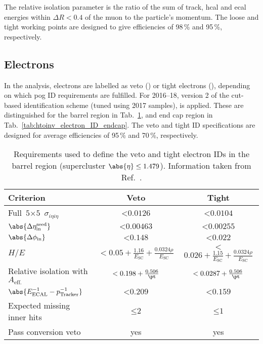 The relative isolation parameter is the ratio of the sum of track, \acrshort{hcal} and \acrshort{ecal} energies within $\Delta R < \text{0.4}$ of the muon to the particle's momentum. The loose and tight working points are designed to give efficiencies of 98\,\% and 95\,\%, respectively.




\subsection{Electrons}
\label{subsec:objects_electrons}

In the analysis, electrons are labelled as veto (\vetoEle) or tight electrons (\tightEle), depending on which \acrshort{pog} ID requirements are fulfilled. For 2016--18, version 2 of the cut-based identification scheme (tuned using 2017 samples), is applied. These are distinguished for the barrel region in Tab.~\ref{tab:htoinv_electron_ID_barrel}, and end cap region in Tab.~\ref{tab:htoinv_electron_ID_endcap}. The veto and tight ID specifications are designed for average efficiencies of 95\,\% and 70\,\%, respectively.

\begin{table}[htbp]
    \centering
    \begin{tabular}{lcc}
    \hline
    Criterion & Veto & Tight \\\hline
    Full $\text{5} \times \text{5}$ $\sigma_{i\eta i\eta}$ & $< \text{0.0126}$ & $< \text{0.0104}$    \\
    $\abs{\Delta\eta_{\mathrm{in}}^{\mathrm{seed}}}$ & $< \text{0.00463}$ & $< \text{0.00255}$ \\
    $\abs{\Delta\phi_{\mathrm{in}}}$ & $< \text{0.148}$ & $< \text{0.022}$ \\
    $H/E$ & $<\text{0.05} + \frac{\text{1.16}}{E_{\mathrm{SC}}} + \frac{\text{0.0324}\rho}{E_{\mathrm{SC}}}$ & $<$ $\text{0.026} + \frac{\text{1.15}}{E_{\mathrm{SC}}} + \frac{\text{0.0324}\rho}{E_{\mathrm{SC}}}$ \\
    Relative isolation with $A_{\mathrm{eff.}}$ & $< \text{0.198} + \frac{\text{0.506}}{\pt}$ & $< \text{0.0287} + \frac{\text{0.506}}{\pt}$\\
    $\abs{E^{-1}_{\mathrm{ECAL}} - p^{-1}_{\mathrm{Tracker}}}$ & $< \text{0.209}$ & $< \text{0.159}$\\
    Expected missing inner hits & $\leq \text{2}$ & $\leq \text{1}$\\
    Pass conversion veto & yes & yes \\
    \hline
    \end{tabular}
    \caption[Requirements used to define the veto and tight electron IDs in the barrel region (supercluster $\abs{\eta} \leq \text{1.479}$)]{Requirements used to define the veto and tight electron IDs in the barrel region (supercluster $\abs{\eta} \leq \text{1.479}$). Information taken from Ref.~.}
    \label{tab:htoinv_electron_ID_barrel}
\end{table}

